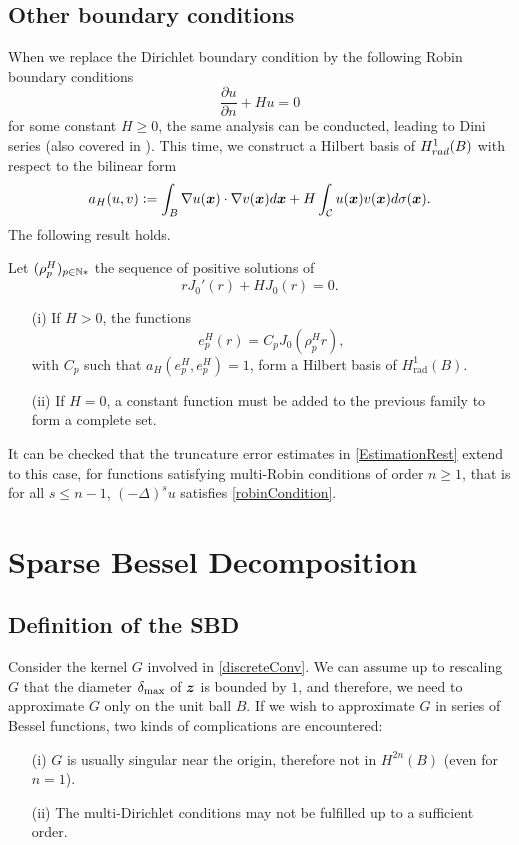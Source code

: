 \documentclass[smallextended]{svjour3}
\begin{document}
\subsection{Other boundary conditions}
\label{Robin}
When we replace the Dirichlet boundary condition by the following Robin boundary conditions
\begin{equation}
	\label{robinCondition}
	\dfrac{\partial u}{\partial n} + H u = 0
\end{equation}
for some constant $H \geq 0$, the same analysis can be conducted, leading to Dini series (also covered in \cite{watson1995treatise}). This time, we construct a Hilbert basis of $H^1_{rad}(B)$ with respect to the bilinear form
\[a_H(u,v) \mathrel{\mathop:}= \int_{B} \nabla u(\boldsymbol{x} ) \cdot \nabla v(\boldsymbol{x} ) d\boldsymbol{x} + H \int_{\mathcal{C}}{u(\boldsymbol{x} )v(\boldsymbol{x} )}d\sigma(\boldsymbol{x} ).\]
The following result holds. 
\begin{theorem}
	Let $(\rho_p^H)_{p \in \mathbb{N}*}$ the sequence of positive solutions of
	\[r J_0'(r) + H J_0(r) = 0.\]
	\begin{itemize}
		\item[(i)] If $H>0$, the functions 
		\[e_p^H(r) = C_p J_0(\rho_p^H r),\]
		with $C_p$ such that $a_H(e_p^H,e_p^H) = 1$, form a Hilbert basis of $H^1_{\text{rad}}(B)$. 
		\item[(ii)]If $H = 0$, a constant function must be added to the previous family to form a complete set. 
	\end{itemize}
\end{theorem}
\noindent It can be checked that the truncature error estimates in \autoref{EstimationRest} extend to this case, for functions satisfying multi-Robin conditions of order $n \geq 1$, that is for all $s\leq n-1$, $(-\Delta)^s u$ satisfies \eqref{robinCondition}.
							
			
										
\section{Sparse Bessel Decomposition}

\label{sec:SBD}
\subsection{Definition of the SBD}
										
Consider the kernel $G$ involved in \eqref{discreteConv}. We can assume up to rescaling $G$ that the diameter $\delta_{\max}$ of $\boldsymbol{z}$ is bounded by $1$, and therefore, we need to approximate $G$ only on the unit ball $B$. 
If we wish to approximate $G$ in series of Bessel functions, two kinds of complications are encountered:
\begin{itemize}
	\item[(i)] $G$ is usually singular near the origin, therefore not in $H^{2n}(B)$ (even for $n=1$). 
	\item[(ii)] The multi-Dirichlet conditions may not be fulfilled up to a sufficient order.
\end{itemize}
\end{document}
